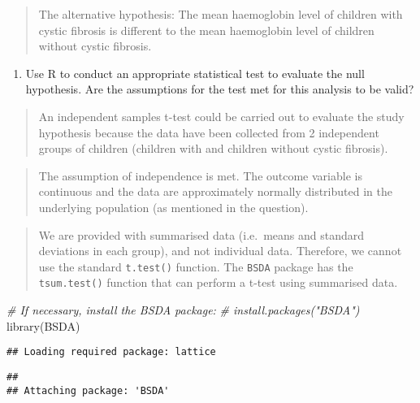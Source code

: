 \documentclass[
]{memoir}
\newenvironment{Shaded}{\begin{snugshade}}{\end{snugshade}}
\newcommand{\CommentTok}[1]{\textcolor[rgb]{0.56,0.35,0.01}{\textit{#1}}}
\newcommand{\FunctionTok}[1]{\textcolor[rgb]{0.00,0.00,0.00}{#1}}
\newcommand{\NormalTok}[1]{#1}
\providecommand{\tightlist}{%
  \setlength{\itemsep}{0pt}\setlength{\parskip}{0pt}}
\begin{document}
\begin{quote}
The alternative hypothesis: The mean haemoglobin level of children with cystic fibrosis is different to the mean haemoglobin level of children without cystic fibrosis.
\end{quote}

\begin{enumerate}
\def\labelenumi{\alph{enumi})}
\setcounter{enumi}{1}
\tightlist
\item
  Use R to conduct an appropriate statistical test to evaluate the null hypothesis. Are the assumptions for the test met for this analysis to be valid?
\end{enumerate}

\begin{quote}
An independent samples t-test could be carried out to evaluate the study hypothesis because the data have been collected from 2 independent groups of children (children with and children without cystic fibrosis).
\end{quote}

\begin{quote}
The assumption of independence is met. The outcome variable is continuous and the data are approximately normally distributed in the underlying population (as mentioned in the question).
\end{quote}

\begin{quote}
We are provided with summarised data (i.e.~means and standard deviations in each group), and not individual data. Therefore, we cannot use the standard \texttt{t.test()} function. The \texttt{BSDA} package has the \texttt{tsum.test()} function that can perform a t-test using summarised data.
\end{quote}

\begin{Shaded}
\begin{Highlighting}[]
\CommentTok{\# If necessary, install the BSDA package:}
\CommentTok{\# install.packages("BSDA")}
\FunctionTok{library}\NormalTok{(BSDA)}
\end{Highlighting}
\end{Shaded}

\begin{verbatim}
## Loading required package: lattice
\end{verbatim}

\begin{verbatim}
## 
## Attaching package: 'BSDA'
\end{verbatim}
\end{document}
